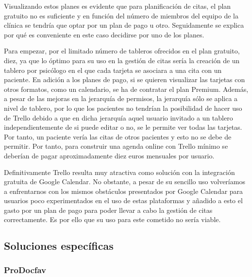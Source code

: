 Visualizando estos planes es evidente que para planificación de citas, el plan gratuito no es suficiente y en función del número de miembros del equipo de la clínica se tendría que optar por un plan de pago u otro. Seguidamente se explica por qué es conveniente en este caso decidirse por uno de los planes. \bigskip

Para empezar, por el limitado número de tableros ofrecidos en el plan gratuito, diez, ya que lo óptimo para su uso en la gestión de citas sería la creación de un tablero por psicólogo en el que cada tarjeta se asociara a una cita con un paciente. En adición a los planes de pago, si se quieren visualizar las tarjetas con otros formatos, como un calendario, se ha de contratar el plan Premium. Además, a pesar de las mejoras en la jerarquía de permisos, la jerarquía sólo se aplica a nivel de tablero, por lo que los pacientes no tendrían la posibilidad de hacer uso de Trello debido a que en dicha jerarquía aquel usuario invitado a un tablero independientemente de si puede editar o no, se le permite ver todas las tarjetas. Por tanto, un paciente vería las citas de otros pacientes y esto no se debe de permitir. Por tanto, para construir una agenda online con Trello mínimo se deberían de pagar aproximadamente diez euros mensuales por usuario. \bigskip

Definitivamente Trello resulta muy atractiva como solución con la integración gratuita de Google Calendar. No obstante, a pesar de su sencillo uso volveríamos a enfrentarnos con los mismos obstáculos presentados por Google Calendar para usuarios poco experimentados en el uso de estas plataformas y añadido a esto el gasto por un plan de pago para poder llevar a cabo la gestión de citas correctamente. Es por ello que su uso para este cometido no sería viable.


\subsection{Soluciones específicas}

\subsubsection*{ProDocfav}

